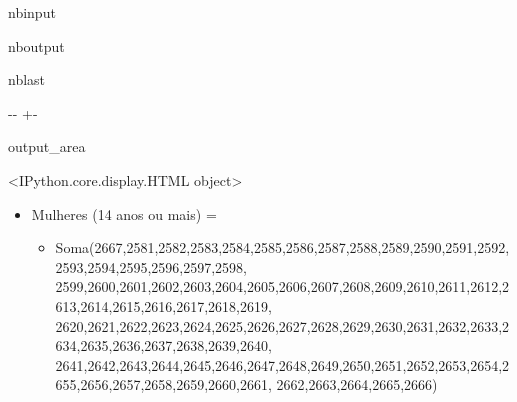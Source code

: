 \documentclass[letterpaper,10pt,brazil]{sphinxmanual}
\newlength\nbsphinxcodecellspacing
\begin{document}
\begin{sphinxuseclass}{nbinput}
{
\begin{sphinxVerbatim}[commandchars=\\\{\}]
\llap{\color{nbsphinxin}[4]:\,\hspace{\fboxrule}\hspace{\fboxsep}}  

\end{sphinxVerbatim}
}

\end{sphinxuseclass}
\begin{sphinxuseclass}{nboutput}
\begin{sphinxuseclass}{nblast}
{

\kern-\sphinxverbatimsmallskipamount\kern-\baselineskip
\kern+\FrameHeightAdjust\kern-\fboxrule
\vspace{\nbsphinxcodecellspacing}

\begin{sphinxuseclass}{output_area}
\begin{sphinxuseclass}{}


\begin{sphinxVerbatim}[commandchars=\\\{\}]
\llap{\color{nbsphinxout}[4]:\,\hspace{\fboxrule}\hspace{\fboxsep}}<IPython.core.display.HTML object>
\end{sphinxVerbatim}



\end{sphinxuseclass}
\end{sphinxuseclass}
}

\end{sphinxuseclass}
\end{sphinxuseclass}\begin{itemize}
\item {} 
\sphinxAtStartPar
Mulheres (14 anos ou mais) =
\begin{itemize}
\item {} 
\sphinxAtStartPar
Soma(2667,2581,2582,2583,2584,2585,2586,2587,2588,2589,2590,2591,2592,2593,2594,2595,2596,2597,2598, 2599,2600,2601,2602,2603,2604,2605,2606,2607,2608,2609,2610,2611,2612,2613,2614,2615,2616,2617,2618,2619, 2620,2621,2622,2623,2624,2625,2626,2627,2628,2629,2630,2631,2632,2633,2634,2635,2636,2637,2638,2639,2640, 2641,2642,2643,2644,2645,2646,2647,2648,2649,2650,2651,2652,2653,2654,2655,2656,2657,2658,2659,2660,2661, 2662,2663,2664,2665,2666)

\end{itemize}

\end{itemize}
\end{document}
